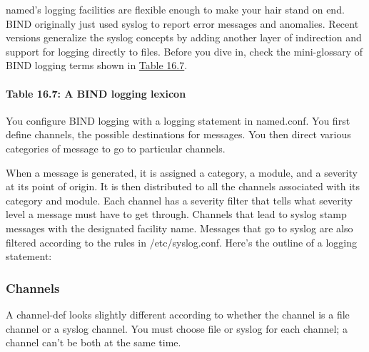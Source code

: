{\protect\hypertarget{part0024_split_070.htmlux5cux23_idIndexMarker2283}{}{}}{named}'s
logging facilities are flexible enough to make your hair stand on end.
BIND
\protect\hypertarget{part0024_split_070.htmlux5cux23_idIndexMarker2284}{}{}originally
just used syslog to report error messages and anomalies. Recent versions
generalize the syslog concepts by adding another layer of indirection
and support for logging directly to files. Before you dive in, check the
mini-glossary of BIND logging terms shown in
\protect\hyperlink{part0024_split_070.htmlux5cux23_idTextAnchor956}{Table
16.7}.

\paragraph[{Table 16.7: }A BIND logging lexicon]{\texorpdfstring{{Table
16.7:
}\protect\hypertarget{part0024_split_070.htmlux5cux23_idTextAnchor956}{}{}A
BIND logging lexicon}{Table 16.7: A BIND logging lexicon}}


You configure BIND logging with a {logging }statement in {named.conf}.
You first define channels, the possible destinations for messages. You
then direct various categories of message to go to particular channels.

When a message is generated, it is assigned a category, a module, and a
severity at its point of origin. It is then distributed to all the
channels associated with its category and module. Each channel has a
severity filter that tells what severity level a message must have to
get through. Channels that lead to syslog stamp messages with the
designated facility name. Messages that go to syslog are also filtered
according to the rules in {/etc/syslog.conf}. Here's the outline of a
{logging}
statement:\protect\hypertarget{part0024_split_070.htmlux5cux23_idIndexMarker2285}{}{}


\subsubsection[Channels]{\texorpdfstring{\protect\hypertarget{part0024_split_070.htmlux5cux23_idTextAnchor957}{}{}Channels}{Channels}}

A {channel-def} looks slightly different according to whether the
channel is a file channel or a syslog channel. You must choose {file} or
{syslog} for each channel; a channel can't be both at the same
time.\protect\hypertarget{part0024_split_070.htmlux5cux23_idIndexMarker2286}{}{}

